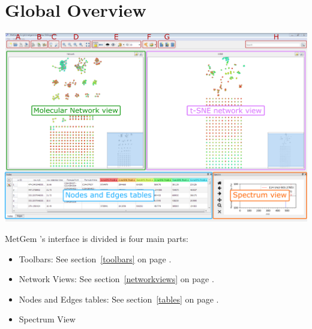 \documentclass[12pt,a4paper,titlepage,dvipsnames]{article}
\title{\appname \appver}
\author{Nicolas ELIE  \\
	CNRS / ICSN	}
\newcommand*{\appname}{MetGem }
\begin{document}
\maketitle
\tableofcontents
\newpage

\section{Global Overview}
\begin{center}
\includegraphics[width=\textwidth]{screenshot1}
\end{center}

\appname's interface is divided is four main parts:
\begin{itemize}
\item Toolbars: See section~\ref{toolbars} on page \pageref{toolbars}.
\item Network Views: See section~\ref{networkviews} on page \pageref{networkviews}.
\item Nodes and Edges tables:  See section~\ref{tables} on page \pageref{tables}.
\item Spectrum View
\end{itemize}
\end{document}
